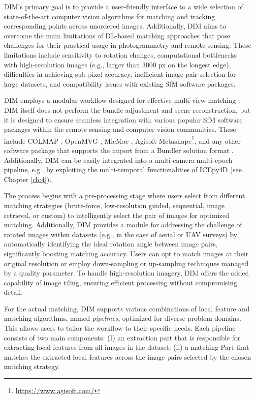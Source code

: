 DIM's primary goal is to provide a user-friendly interface to a wide selection of state-of-the-art computer vision algorithms for matching and tracking corresponding points across unordered images.
Additionally, DIM aims to overcome the main limitations of DL-based matching approaches that pose challenges for their practical usage in photogrammetry and remote sensing. 
These limitations include sensitivity to rotation changes, computational bottlenecks with high-resolution images (e.g., larger than 3000 px on the longest edge), difficulties in achieving sub-pixel accuracy, inefficient image pair selection for large datasets, and compatibility issues with existing SfM software packages.  

DIM employs a modular workflow designed for effective multi-view matching .
DIM itself does not perform the bundle adjustment and scene reconstruction, but it is designed to ensure seamless integration with various popular SfM software packages within the remote sensing and computer vision communities. 
These include COLMAP \citep{schoenberger2016sfm}, OpenMVG \citep{moulon2016openmvg}, MicMac \citep{rupnik2017micmac}, Agisoft Metashape\footnote{\url{https://www.agisoft.com/}}, 
and any other software package that supports the import from a Bundler solution format \citep{Li_Snavely_2018_MegaDepth}.
Additionally, DIM can be easily integrated into a multi-camera multi-epoch pipeline, e.g., by exploiting the multi-temporal functionalities of ICEpy4D (see Chapter \ref{ch:4}).

The process begins with a pre-processing stage where users select from different matching strategies (brute-force, low-resolution guided, sequential, image retrieval, or custom) to intelligently select the pair of images for optimized matching. 
Additionally, DIM provides a module for addressing the challenge of rotated images within datasets (e.g., in the case of aerial or UAV surveys) by automatically identifying the ideal rotation angle between image pairs, significantly boosting matching accuracy. Users can opt to match images at their original resolution or employ down-sampling or up-sampling techniques managed by a quality parameter.
To handle high-resolution imagery, DIM offers the added capability of image tiling, ensuring efficient processing without compromising detail. 

For the actual matching, DIM supports various combinations of local feature and matching algorithms, named \textit{pipelines}, optimized for diverse problem domains. This allows users to tailor the workflow to their specific needs. Each pipeline consists of two main components: (I) an extraction part that is responsible for extracting local features from all images in the dataset; (ii) a matching Part that matches the extracted local features across the image pairs selected by the chosen matching strategy.  

